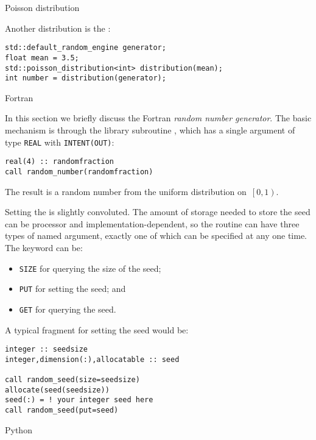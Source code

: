  {Poisson distribution}

  Another distribution is the :
\begin{lstlisting}
std::default_random_engine generator;
float mean = 3.5;
std::poisson_distribution<int> distribution(mean);
int number = distribution(generator);
\end{lstlisting}


 {Fortran}
\lstset{language=Fortran}

In this section we briefly discuss the Fortran \emph{random number generator}.
The basic mechanism is through the library subroutine
, which has a single argument of type
\lstinline{REAL} with \lstinline{INTENT(OUT)}:
\begin{lstlisting}
real(4) :: randomfraction
call random_number(randomfraction)
\end{lstlisting}
The result is a random number from the uniform distribution
on~$\left[0,1\right)$.
  
Setting the  is slightly convoluted. The
amount of storage needed to store the seed can be processor and
implementation-dependent, so the routine 
can have three types of named argument, exactly one of which can be
specified at any one time. The keyword can be:
\begin{itemize}
\item \lstinline{SIZE} for querying the size of the seed;
\item \lstinline{PUT} for setting the seed; and
\item \lstinline{GET} for querying the seed.
\end{itemize}
A typical fragment for setting the seed would be:
\begin{lstlisting}
integer :: seedsize
integer,dimension(:),allocatable :: seed

call random_seed(size=seedsize)
allocate(seed(seedsize))
seed(:) = ! your integer seed here
call random_seed(put=seed)
\end{lstlisting}


 {Python}
\lstset{language=Python}

